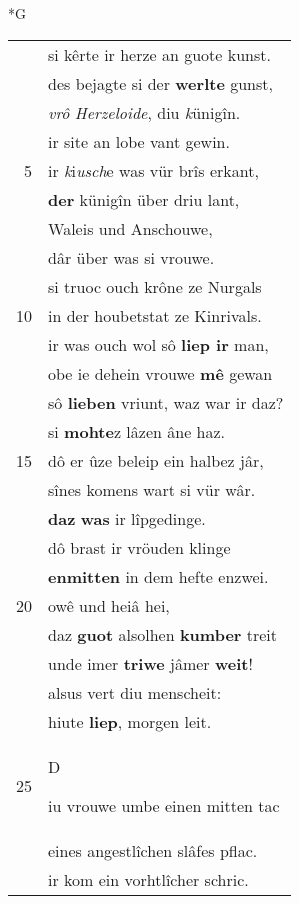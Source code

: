 \documentclass[8pt,a4paper,notitlepage]{article}
\begin{document}
\begin{table}[ht]
\begin{minipage}[t]{0.5\linewidth}
\small
\begin{center}*G
\end{center}
\begin{tabular}{rl}
 & si kêrte ir herze an guote kunst.\\ 
 & des bejagte si der \textbf{werlte} gunst,\\ 
 & \textit{vrô} \textit{Herzeloide}, diu \textit{k}ünigîn.\\ 
 & ir site an lobe vant gewin.\\ 
5 & ir \textit{k}i\textit{usch}e was vür brîs erkant,\\ 
 & \textbf{der} künigîn über driu lant,\\ 
 & Waleis und Anschouwe,\\ 
 & dâr über was si vrouwe.\\ 
 & si truoc ouch krône ze Nurgals\\ 
10 & in der houbetstat ze Kinrivals.\\ 
 & ir was ouch wol sô \textbf{liep ir} man,\\ 
 & obe ie dehein vrouwe \textbf{mê} gewan\\ 
 & sô \textbf{lieben} vriunt, waz war ir daz?\\ 
 & si \textbf{mohte}z lâzen âne haz.\\ 
15 & dô er ûze beleip ein halbez jâr,\\ 
 & sînes komens wart si vür wâr.\\ 
 & \textbf{daz} \textbf{was} ir lîpgedinge.\\ 
 & dô brast ir vröuden klinge\\ 
 & \textbf{enmitten} in dem hefte enzwei.\\ 
20 & owê und heiâ hei,\\ 
 & daz \textbf{guot} alsolhen \textbf{kumber} treit\\ 
 & unde imer \textbf{triwe} jâmer \textbf{weit}!\\ 
 & alsus vert diu menscheit:\\ 
 & hiute \textbf{liep}, morgen leit.\\ 
25 & \begin{large}D\end{large}iu vrouwe umbe einen mitten tac\\ 
 & eines angestlîchen slâfes pflac.\\ 
 & ir kom ein vorhtlîcher schric.\\ 

\end{tabular}
\end{minipage}
\end{table}
\end{document}

